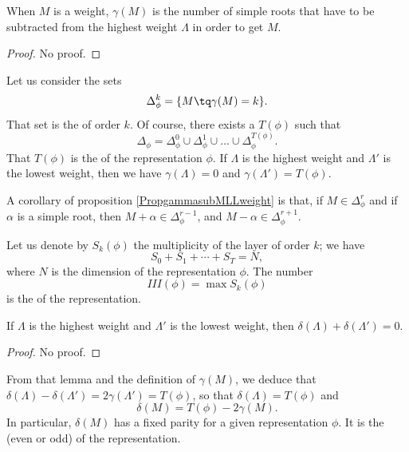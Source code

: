 \begin{proposition}     \label{PropgammasubMLLweight}
When $M$ is a weight, $\gamma(M)$ is the number of simple roots that have to be subtracted from the highest weight $\Lambda$ in order to get $M$.
\end{proposition}
\begin{proof}
    No proof.
\end{proof}

Let us consider the sets
\begin{equation}
    \Delta_{\phi}^k=\{ M\tq\gamma(M)=k \}.
\end{equation}
That set is the  of order $k$. Of course, there exists a $T(\phi)$ such that
\begin{equation}
    \Delta_{\phi}=\Delta_{\phi}^0\cup\Delta_{\phi}^1\cup\ldots\cup\Delta_{\phi}^{T(\phi)}.
\end{equation}
That $T(\phi)$ is the  of the representation $\phi$. If $\Lambda$ is the highest weight and $\Lambda'$ is the lowest weight, then we have $\gamma(\Lambda)=0$ and $\gamma(\Lambda')=T(\phi)$.

A corollary of proposition \ref{PropgammasubMLLweight} is that, if $M\in\Delta_{\phi}^r$ and if $\alpha$ is a simple root, then $M+\alpha\in\Delta_{\phi}^{r-1}$, and $M-\alpha\in\Delta_{\phi}^{r+1}$. 

Let us denote by $S_k(\phi)$ the multiplicity of the layer of order $k$; we have
\begin{equation}
    S_0+S_1+\cdots+S_T=N,
\end{equation}
where $N$ is the dimension of the representation $\phi$. The number 
\begin{equation}
    III(\phi)=\max S_k(\phi)
\end{equation}
is the  of the representation.

\begin{lemma}   
    If $\Lambda$ is the highest weight and $\Lambda'$ is the lowest weight, then $\delta(\Lambda)+\delta(\Lambda')=0$.
\end{lemma}
\begin{proof}
    No proof.
\end{proof}
From that lemma and the definition of $\gamma(M)$, we deduce that $\delta(\Lambda)-\delta(\Lambda')=2\gamma(\Lambda')=T(\phi)$, so that $\delta(\Lambda)=T(\phi)$ and
\begin{equation}
     \delta(M)=T(\phi)-2\gamma(M).
\end{equation}
In particular, $\delta(M)$ has a fixed parity for a given representation $\phi$. It is the  (even or odd) of the representation.


